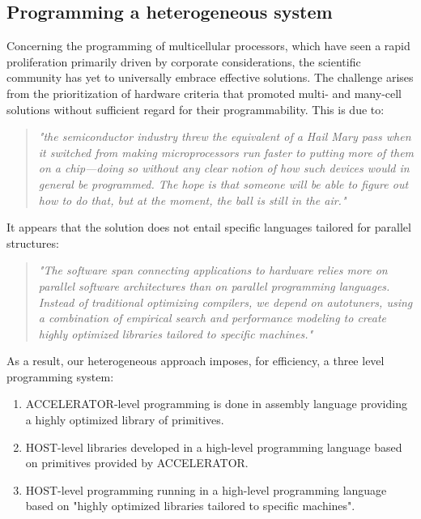 \subsection{Programming a heterogeneous system}

Concerning the programming of multicellular processors, which have seen a rapid proliferation primarily driven by corporate considerations, the scientific community has yet to universally embrace effective solutions. The challenge arises from the prioritization of hardware criteria that promoted multi- and many-cell solutions without sufficient regard for their programmability. This is due to:
{\small
\begin{quote}
{\em "the semiconductor industry threw the equivalent of a Hail
Mary pass when it switched from making microprocessors run faster to
putting more of them on a chip—doing so without any clear notion of how
such devices would in general be programmed. The hope is that someone
will be able to figure out how to do that, but at the moment, the ball is still in the air."} \cite{Patterson10}
\end{quote}
}


It appears that the solution does not entail specific languages tailored for parallel structures:
{\small
\begin{quote}
{\em "The software span connecting applications to hardware relies more on parallel software architectures than on parallel programming languages. Instead of traditional optimizing compilers, we depend on autotuners, using a combination of empirical search and performance modeling to create highly optimized libraries tailored to specific machines."} \cite{Asanovic09}
\end{quote}
}

As a result, our heterogeneous approach imposes, for efficiency, a three level programming system:
\begin{enumerate}
    \item ACCELERATOR-level programming is done in assembly language providing a highly optimized library of primitives.
    \item HOST-level libraries  developed  in a high-level programming language  based on primitives provided by ACCELERATOR.
    \item HOST-level programming running  in a high-level programming language based on "highly optimized libraries tailored to specific machines".
\end{enumerate}

